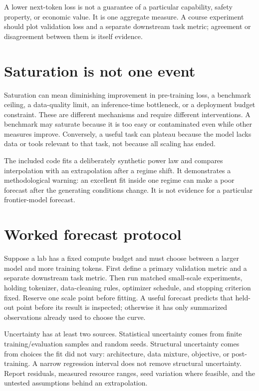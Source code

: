 \documentclass[11pt]{article}
\begin{document}
A lower next-token loss is not a guarantee of a particular capability, safety property, or economic value. It is one aggregate measure. A course experiment should plot validation loss and a separate downstream task metric; agreement or disagreement between them is itself evidence.

\section{Saturation is not one event}
Saturation can mean diminishing improvement in pre-training loss, a benchmark ceiling, a data-quality limit, an inference-time bottleneck, or a deployment budget constraint. These are different mechanisms and require different interventions. A benchmark may saturate because it is too easy or contaminated even while other measures improve. Conversely, a useful task can plateau because the model lacks data or tools relevant to that task, not because all scaling has ended.

The included code fits a deliberately synthetic power law and compares interpolation with an extrapolation after a regime shift. It demonstrates a methodological warning: an excellent fit inside one regime can make a poor forecast after the generating conditions change. It is not evidence for a particular frontier-model forecast.

\section{Worked forecast protocol}
Suppose a lab has a fixed compute budget and must choose between a larger model and more training tokens. First define a primary validation metric and a separate downstream task metric. Then run matched small-scale experiments, holding tokenizer, data-cleaning rules, optimizer schedule, and stopping criterion fixed. Reserve one scale point before fitting. A useful forecast predicts that held-out point before its result is inspected; otherwise it has only summarized observations already used to choose the curve.

Uncertainty has at least two sources. Statistical uncertainty comes from finite training/evaluation samples and random seeds. Structural uncertainty comes from choices the fit did not vary: architecture, data mixture, objective, or post-training. A narrow regression interval does not remove structural uncertainty. Report residuals, measured resource ranges, seed variation where feasible, and the untested assumptions behind an extrapolation.
\end{document}
